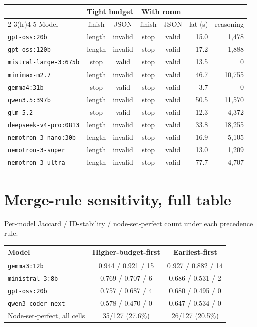 \documentclass{article}
\begin{document}
\begin{center}
\small
\begin{tabular}{lccccrr}
\toprule
& \multicolumn{2}{c}{Tight budget} & \multicolumn{2}{c}{With room} & & \\
\cmidrule(lr){2-3}\cmidrule(lr){4-5}
Model & finish & JSON & finish & JSON & lat (s) & reasoning \\
\midrule
\texttt{gpt-oss:20b} & length & invalid & stop & valid & 15.0 & 1,478 \\
\texttt{gpt-oss:120b} & length & invalid & stop & valid & 17.2 & 1,888 \\
\texttt{mistral-large-3:675b} & stop & valid & stop & valid & 13.5 & 0 \\
\texttt{minimax-m2.7} & length & invalid & stop & valid & 46.7 & 10,755 \\
\texttt{gemma4:31b} & stop & valid & stop & valid & 3.7 & 0 \\
\texttt{qwen3.5:397b} & length & invalid & stop & valid & 50.5 & 11,570 \\
\texttt{glm-5.2} & stop & valid & stop & valid & 12.3 & 4,372 \\
\texttt{deepseek-v4-pro:0813} & length & invalid & stop & valid & 33.8 & 18,255 \\
\texttt{nemotron-3-nano:30b} & length & invalid & stop & valid & 16.9 & 5,105 \\
\texttt{nemotron-3-super} & length & invalid & stop & valid & 13.0 & 1,209 \\
\texttt{nemotron-3-ultra} & length & invalid & stop & valid & 77.7 & 4,707 \\
\bottomrule
\end{tabular}
\end{center}

\section{Merge-rule sensitivity, full table}
\label{app:merge}
Per-model Jaccard / ID-stability / node-set-perfect count under each precedence rule.

\begin{center}
\small
\begin{tabular}{lcc}
\toprule
Model & Higher-budget-first & Earliest-first \\
\midrule
\texttt{gemma3:12b}           & 0.944 / 0.921 / 15 & 0.927 / 0.882 / 14 \\
\texttt{ministral-3:8b}       & 0.769 / 0.707 / 6  & 0.686 / 0.531 / 2  \\
\texttt{gpt-oss:20b}          & 0.757 / 0.687 / 4  & 0.680 / 0.495 / 0  \\
\texttt{qwen3-coder-next}     & 0.578 / 0.470 / 0  & 0.647 / 0.534 / 0  \\
\midrule
Node-set-perfect, all cells   & 35/127 (27.6\%)    & 26/127 (20.5\%)    \\
\bottomrule
\end{tabular}
\end{center}
\end{document}

